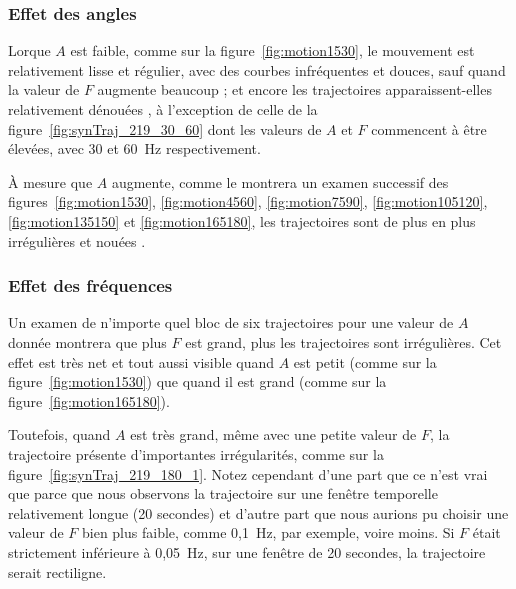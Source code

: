 	\subsubsection{Effet des angles}
	Lorque $A$ est faible, comme sur la figure~\ref{fig:motion1530}, le mouvement est relativement lisse et régulier, avec des courbes infréquentes et douces, sauf quand la valeur de $F$ augmente beaucoup ; et encore les trajectoires apparaissent-elles relativement \og dénouées \fg{}, à l'exception de celle de la figure~\ref{fig:synTraj_219_30_60} dont les valeurs de $A$ et $F$ commencent à être élevées, avec 30\textdegree{} et 60~Hz respectivement.
	
	À mesure que $A$ augmente, comme le montrera un examen successif des figures~\ref{fig:motion1530}, \ref{fig:motion4560}, \ref{fig:motion7590}, \ref{fig:motion105120}, \ref{fig:motion135150} et \ref{fig:motion165180}, les trajectoires sont de plus en plus irrégulières et \og nouées \fg{}.
	
	\subsubsection{Effet des fréquences}
	Un examen de n'importe quel bloc de six trajectoires pour une valeur de $A$ donnée montrera que plus $F$ est grand, plus les trajectoires sont irrégulières. Cet effet est très net et tout aussi visible quand $A$ est petit (comme sur la figure~\ref{fig:motion1530}) que quand il est grand (comme sur la figure~\ref{fig:motion165180}).
	
	Toutefois, quand $A$ est très grand, même avec une petite valeur de $F$, la trajectoire présente d'importantes irrégularités, comme sur la figure~\ref{fig:synTraj_219_180_1}. Notez cependant d'une part que ce n'est vrai que parce que nous observons la trajectoire sur une fenêtre temporelle relativement longue (20 secondes) et d'autre part que nous aurions pu choisir une valeur de $F$ bien plus faible, comme 0,1~Hz, par exemple, voire moins. Si $F$ était strictement inférieure à 0,05~Hz, sur une fenêtre de 20 secondes, la trajectoire serait rectiligne.
	
